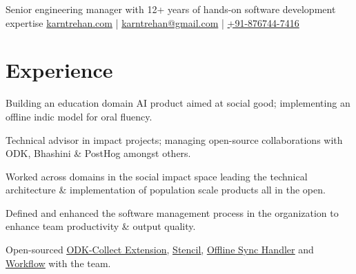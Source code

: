 \documentclass[]{deedy-resume-reversed}
\begin{document}
%
%

%
%
{Senior engineering manager with 12+ years of hands-on software development expertise}
{\href{https://karntrehan.com}{karntrehan.com} | 
\href{mailto:karntrehan@gmail.com}{karntrehan@gmail.com} | \href{tel:+918767447416}{+91-876744-7416}
}

%
%

\begin{minipage}[t]{0.60\textwidth}


\section{Experience}
\vspace{\topsep} %


\textbullet{}
\vspace{\topsep} %
\begin{tightemize}
\item Building an education domain AI product aimed at social good; implementing an offline indic model for oral fluency.
\item Technical advisor in impact projects; managing open-source collaborations with ODK, Bhashini \& PostHog amongst others.
\end{tightemize}

\textbullet{}
\begin{tightemize}
\item Worked across domains in the social impact space leading the technical architecture \& implementation of population scale products all in the open.
\item Defined and enhanced the software management process in the organization to enhance team productivity \& output quality.
\item Open-sourced {\href{https://github.com/Samagra-Development/odk-collect-extension}{\underline{ODK-Collect Extension}}}, {\href{https://github.com/SamagraX-Stencil}{\underline{Stencil}}}, {\href{https://github.com/Samagra-Development/offline-sync-handler}{\underline{Offline Sync Handler}}} and {\href{https://github.com/Samagra-Development/workflow}{\underline{Workflow}}} with the team.
\end{tightemize}
\sectionsep


\end{minipage}
\end{document}
